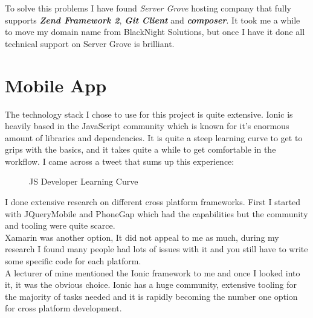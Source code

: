 To solve this problems I have found \textit{Server Grove} hosting company that fully supports \textbf{\textit{Zend Framework 2}}, \textbf{\textit{Git Client}} and  \textbf{\textit{composer}}. It took me a while to move my domain name from BlackNight Solutions, but once I have it done all technical support on Server Grove is brilliant.


  \section{Mobile App} %
The technology stack I chose to use for this project is quite extensive.  
Ionic is heavily based in the JavaScript community which is known for it's enormous amount of libraries and dependencies.
It is quite a steep learning curve to get to grips with the basics, and it takes quite a while to get comfortable in the workflow.
I came across a tweet that sums up this experience:
\begin{figure}[H] 
	\caption{JS Developer Learning Curve}
	\label{fig:speciation}
\end{figure}


I  done extensive research on different cross platform frameworks.
First I started with JQueryMobile and PhoneGap which had the capabilities but the community and tooling were quite scarce. 
\\ 

Xamarin was another option, It did not appeal to me as much, during my research I found many people had lots of issues with it and you still have to write some specific code for each platform.
\\ 

A lecturer of mine mentioned the Ionic framework to me and once I looked into it, it was the obvious choice.
Ionic has a huge community, extensive tooling for the majority of tasks needed and it is rapidly becoming the number one option for cross platform development.
\\

